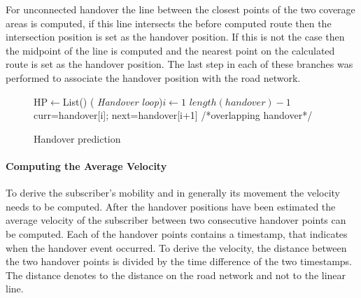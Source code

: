 For unconnected handover the line between the closest points of the two coverage areas is computed, if this line intersects the before computed route then the intersection position is set as the handover position. If this is not the case then the midpoint of the line is computed and the nearest point on the calculated route is set as the handover position. The last step in each of these branches was performed to associate the handover position with the road network.
\SetAlFnt{\footnotesize}

\begin{figure}[!t]
	\removelatexerror
	\begin{algorithm}[H]
		\caption{Handover prediction}
		\label{alg:prediction}
		HP$\leftarrow$List()\;
		\For( \emph{Handover loop}){$i\leftarrow 1$ \KwTo $length(handover)-1$}
		{
			curr=handover[i]; next=handover[i+1]\;
			/*overlapping handover*/\\
		}
	\end{algorithm}
\end{figure}

\paragraph{Computing the Average Velocity}
To derive the subscriber's mobility and in generally its movement the velocity needs to be computed. 
After the handover positions have been estimated the average velocity of the subscriber between two consecutive handover points can be computed. 
Each of the handover points contains a timestamp, that indicates when the handover event occurred. To derive the velocity, the distance between the two handover points is divided by the time difference of the two timestamps. The distance denotes to the distance on the road network and not to the linear line. 

